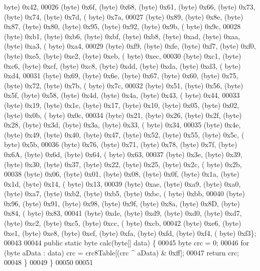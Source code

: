 \begin{DoxyCode}
      byte) 0x42,
00026             (byte) 0x6f, (byte) 0x68, (byte) 0x61, (byte) 0x66, (byte) 0x73, (byte) 0x74, (byte) 0x7d, (
      byte) 0x7a,
00027             (byte) 0x89, (byte) 0x8e, (byte) 0x87, (byte) 0x80, (byte) 0x95, (byte) 0x92, (byte) 0x9b, (
      byte) 0x9c,
00028             (byte) 0xb1, (byte) 0xb6, (byte) 0xbf, (byte) 0xb8, (byte) 0xad, (byte) 0xaa, (byte) 0xa3, (
      byte) 0xa4,
00029             (byte) 0xf9, (byte) 0xfe, (byte) 0xf7, (byte) 0xf0, (byte) 0xe5, (byte) 0xe2, (byte) 0xeb, (
      byte) 0xec,
00030             (byte) 0xc1, (byte) 0xc6, (byte) 0xcf, (byte) 0xc8, (byte) 0xdd, (byte) 0xda, (byte) 0xd3, (
      byte) 0xd4,
00031             (byte) 0x69, (byte) 0x6e, (byte) 0x67, (byte) 0x60, (byte) 0x75, (byte) 0x72, (byte) 0x7b, (
      byte) 0x7c,
00032             (byte) 0x51, (byte) 0x56, (byte) 0x5f, (byte) 0x58, (byte) 0x4d, (byte) 0x4a, (byte) 0x43, (
      byte) 0x44,
00033             (byte) 0x19, (byte) 0x1e, (byte) 0x17, (byte) 0x10, (byte) 0x05, (byte) 0x02, (byte) 0x0b, (
      byte) 0x0c,
00034             (byte) 0x21, (byte) 0x26, (byte) 0x2f, (byte) 0x28, (byte) 0x3d, (byte) 0x3a, (byte) 0x33, (
      byte) 0x34,
00035             (byte) 0x4e, (byte) 0x49, (byte) 0x40, (byte) 0x47, (byte) 0x52, (byte) 0x55, (byte) 0x5c, (
      byte) 0x5b,
00036             (byte) 0x76, (byte) 0x71, (byte) 0x78, (byte) 0x7f, (byte) 0x6A, (byte) 0x6d, (byte) 0x64, (
      byte) 0x63,
00037             (byte) 0x3e, (byte) 0x39, (byte) 0x30, (byte) 0x37, (byte) 0x22, (byte) 0x25, (byte) 0x2c, (
      byte) 0x2b,
00038             (byte) 0x06, (byte) 0x01, (byte) 0x08, (byte) 0x0f, (byte) 0x1a, (byte) 0x1d, (byte) 0x14, (
      byte) 0x13,
00039             (byte) 0xae, (byte) 0xa9, (byte) 0xa0, (byte) 0xa7, (byte) 0xb2, (byte) 0xb5, (byte) 0xbc, (
      byte) 0xbb,
00040             (byte) 0x96, (byte) 0x91, (byte) 0x98, (byte) 0x9f, (byte) 0x8a, (byte) 0x8D, (byte) 0x84, (
      byte) 0x83,
00041             (byte) 0xde, (byte) 0xd9, (byte) 0xd0, (byte) 0xd7, (byte) 0xc2, (byte) 0xc5, (byte) 0xcc, (
      byte) 0xcb,
00042             (byte) 0xe6, (byte) 0xe1, (byte) 0xe8, (byte) 0xef, (byte) 0xfa, (byte) 0xfd, (byte) 0xf4, (
      byte) 0xf3\};
00043 
00044     \textcolor{keyword}{public} \textcolor{keyword}{static} byte calc(byte[] data) \{
00045         byte crc = 0;
00046         \textcolor{keywordflow}{for} (byte aData : data) crc = crc8Table[(crc ^ aData) & 0xff];
00047         \textcolor{keywordflow}{return} crc;
00048     \}
00049 \}
00050 
00051 
\end{DoxyCode}
